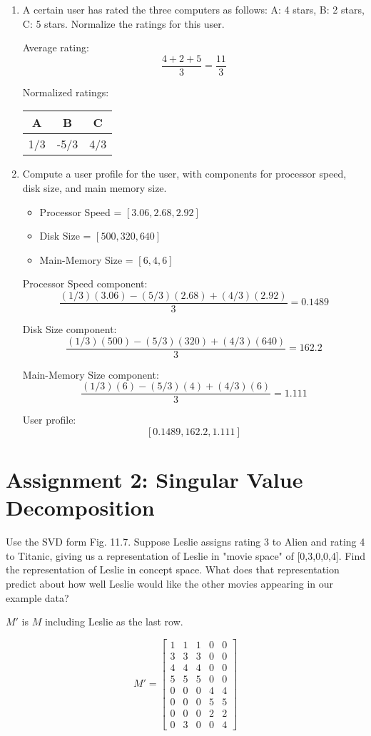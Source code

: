 \documentclass{article}
\begin{document}
\begin{enumerate}
\item{A certain user has rated the three computers as follows: A: 4 stars, B: 2 stars, C: 5 stars. Normalize the ratings for this user.

Average rating: $$\frac{4+2+5}{3} = \frac{11}{3}$$

Normalized ratings:
	\begin{center}
	\begin{tabular}{ c | c | c }
		A    & B     & C    \\ \hline
		1/3 & -5/3 & 4/3
	\end{tabular}
\end{center}
}
\item{Compute a user profile for the user, with components for processor speed, disk size, and main memory size.
	
	\begin{itemize}
		\item Processor Speed = $[3.06, 2.68, 2.92]$
		\item Disk Size = $[500, 320, 640]$
		\item Main-Memory Size = $[6, 4, 6]$
	\end{itemize}

	Processor Speed component:
	$$\frac{(1/3)(3.06)-(5/3)(2.68)+(4/3)(2.92)}{3} = 0.1489$$

	Disk Size component:
	$$\frac{(1/3)(500)-(5/3)(320)+(4/3)(640)}{3} = 162.2$$
	
	Main-Memory Size component:
	$$\frac{(1/3)(6)-(5/3)(4)+(4/3)(6)}{3} = 1.111$$

	User profile:
	$$[0.1489, 162.2, 1.111]$$

}
\end{enumerate}

\section{Assignment 2: Singular Value Decomposition}
Use the SVD form Fig. 11.7. Suppose Leslie assigns rating 3 to Alien and rating 4 to Titanic, giving us a representation of Leslie in "movie space" of [0,3,0,0,4]. Find the representation of Leslie in concept space. What does that representation predict about how well Leslie would like the other movies appearing in our example data?

$M'$ is $M$ including Leslie as the last row.

\[
M' = \begin{bmatrix}
	1 & 1 & 1 & 0 & 0 \\
	3 & 3 & 3 & 0 & 0 \\
	4 & 4 & 4 & 0 & 0 \\
	5 & 5 & 5 & 0 & 0 \\
	0 & 0 & 0 & 4 & 4 \\
	0 & 0 & 0 & 5 & 5 \\
	0 & 0 & 0 & 2 & 2 \\
	0 & 3 & 0 & 0 & 4
\end{bmatrix}
\]
\end{document}
